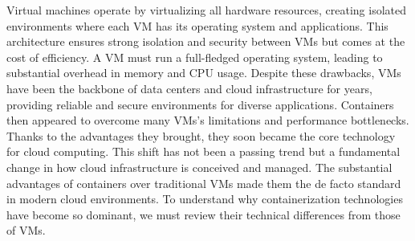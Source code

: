 
Virtual machines operate by virtualizing all hardware resources, creating
isolated environments where each VM has its operating system and applications.
This architecture ensures strong isolation and security between VMs but comes at
the cost of efficiency. A VM must run a full-fledged operating system, leading
to substantial overhead in memory and CPU usage. Despite these drawbacks, VMs
have been the backbone of data centers and cloud infrastructure for years,
providing reliable and secure environments for diverse applications. Containers
then appeared to overcome many VMs's limitations and performance bottlenecks.
Thanks to the advantages they brought, they soon became the core technology for
cloud computing. This shift has not been a passing trend but a fundamental
change in how cloud infrastructure is conceived and
managed\cite{Casalicchio2020TheSI, Bentaleb2021,
zhang2018comparativestudycontainersvirtual}. The substantial advantages of
containers over traditional VMs made them the de facto standard in modern cloud
environments. To understand why containerization technologies have become so
dominant, we must review their technical differences from those of VMs.

